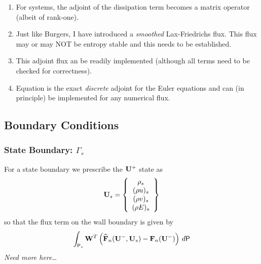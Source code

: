 \documentclass[12pt]{article}
\begin{document}
\medskip
{}
\begin{enumerate}
\item For systems, the adjoint of the dissipation term becomes a matrix
  operator (albeit of rank-one).
\item Just like Burgers, I have introduced a {\em smoothed} Lax-Friedrichs
  flux.  This flux may or may NOT be entropy stable and this needs to be
  established.
\item This adjoint flux an be readily implemented (although all terms need to
  be checked for correctness).
\item Equation  is the exact {\em discrete} adjoint for
  the Euler equations and can (in principle) be implemented for any numerical
  flux.
\end{enumerate}

\subsection{Boundary Conditions}

\subsubsection{State Boundary: $\Gamma_s$}

For a state boundary we prescribe the ${{\bf U}}^+$ state as
\begin{equation}
{{\bf U}}_s = \left\{ \begin{array}{c} 
\rho_s \\
(\rho u)_s \\
(\rho v)_s \\
(\rho E)_s \\
\end{array} \right\}
\end{equation}
so that the flux term on the wall boundary is given by
\begin{equation}
\int_{{\sf P}_s} {\bf W}^T \left( {\widehat{{\bf F}}}_n({{\bf U}}^-,{{\bf U}}_s) - {\bf F}_n({{\bf U}}^-) \right) \,d{\sf P}
\end{equation}{\em Need more here\dots}
\end{document}
